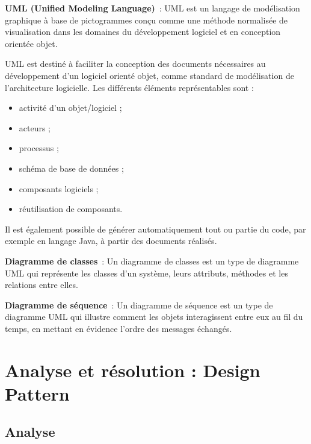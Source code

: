 \vspace{0.5cm}

\noindent \textbf{UML (Unified Modeling Language)}~: UML  est un langage de modélisation graphique à base de pictogrammes conçu comme une méthode normalisée de visualisation dans les domaines du développement logiciel et en conception orientée objet. 

UML est destiné à faciliter la conception des documents nécessaires au développement d'un logiciel orienté objet, comme standard de modélisation de l'architecture logicielle. Les différents éléments représentables sont :
\begin{itemize}
	\item activité d'un objet/logiciel ;
    \item acteurs ;
    \item processus ;
    \item schéma de base de données ;
    \item composants logiciels ;
    \item réutilisation de composants.   
\end{itemize}

\noindent Il est également possible de générer automatiquement tout ou partie du code, par exemple en langage Java, à partir des documents réalisés. 

\vspace{0.5cm}

\noindent \textbf{Diagramme de classes}~: Un diagramme de classes est un type de diagramme UML qui représente les classes d'un système, leurs attributs, méthodes et les relations entre elles.

\vspace{0.5cm}

\noindent \textbf{Diagramme de séquence}~: Un diagramme de séquence est un type de diagramme UML qui illustre comment les objets interagissent entre eux au fil du temps, en mettant en évidence l'ordre des messages échangés.

\newpage

\section*{Analyse et résolution : Design Pattern}

\subsection*{Analyse}
{}

